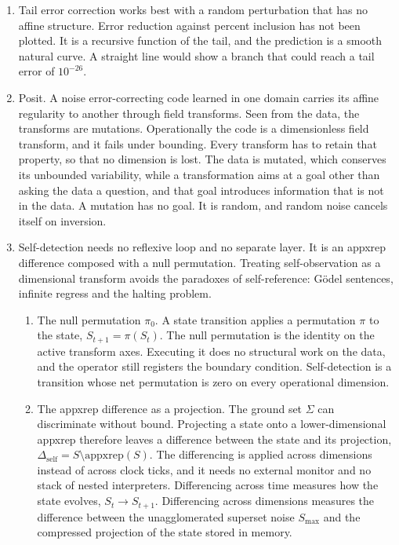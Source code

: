 \begin{enumerate}
\item Tail error correction works best with a random perturbation that has no affine structure. Error
reduction against percent inclusion has not been plotted. It is a recursive function of the tail, and
the prediction is a smooth natural curve. A straight line would show a branch that could reach a tail
error of $10^{-26}$.

\item Posit. A noise error-correcting code learned in one domain carries its affine regularity to
another through field transforms. Seen from the data, the transforms are mutations. Operationally the
code is a dimensionless field transform, and it fails under bounding. Every transform has to retain
that property, so that no dimension is lost. The data is mutated, which conserves its unbounded
variability, while a transformation aims at a goal other than asking the data a question, and that
goal introduces information that is not in the data. A mutation has no goal. It is random, and random
noise cancels itself on inversion.

\item Self-detection needs no reflexive loop and no separate layer. It is an appxrep difference
composed with a null permutation. Treating self-observation as a dimensional transform avoids the
paradoxes of self-reference: Gödel sentences, infinite regress and the halting problem.
\begin{enumerate}
\item The null permutation $\pi_0$. A state transition applies a permutation $\pi$ to the state,
$S_{t+1} = \pi(S_t)$. The null permutation is the identity on the active transform axes. Executing it
does no structural work on the data, and the operator still registers the boundary condition.
Self-detection is a transition whose net permutation is zero on every operational dimension.

\item The appxrep difference as a projection. The ground set $\Sigma$ can discriminate without bound.
Projecting a state onto a lower-dimensional appxrep therefore leaves a difference between the state and its
projection, $\Delta_{\mathrm{self}} = S \setminus \mathrm{appxrep}(S)$. The differencing is applied
across dimensions instead of across clock ticks, and it needs no external monitor and no stack of
nested interpreters. Differencing across time measures how the state evolves, $S_t \to S_{t+1}$.
Differencing across dimensions measures the difference between the unagglomerated superset noise
$S_{\max}$ and the compressed projection of the state stored in memory.


\end{enumerate}
\end{enumerate}
